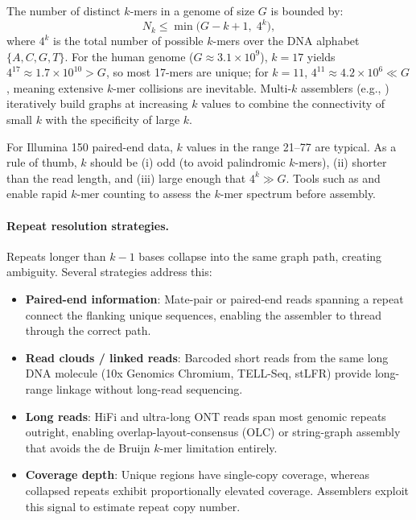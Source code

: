 The number of distinct $k$-mers in a genome of size $G$ is bounded by:
\begin{equation}
\label{eq:genomeseq:kmers}
N_k \leq \min\!\bigl(G - k + 1,\; 4^k\bigr),
\end{equation}
where $4^k$ is the total number of possible $k$-mers over the DNA alphabet $\{A,C,G,T\}$. For the human genome ($G \approx 3.1 \times 10^9$), $k = 17$ yields $4^{17} \approx 1.7 \times 10^{10} > G$, so most 17-mers are unique; for $k = 11$, $4^{11} \approx 4.2 \times 10^6 \ll G$, meaning extensive $k$-mer collisions are inevitable. Multi-$k$ assemblers (e.g., ) iteratively build graphs at increasing $k$ values to combine the connectivity of small $k$ with the specificity of large $k$.

\begin{tipbox}[title={Practical $k$-mer Selection Rules}]
For Illumina 150\basepair{} paired-end data, $k$ values in the range 21--77 are typical. As a rule of thumb, $k$ should be (i) odd (to avoid palindromic $k$-mers), (ii) shorter than the read length, and (iii) large enough that $4^k \gg G$. Tools such as  and  enable rapid $k$-mer counting to assess the $k$-mer spectrum before assembly.
\end{tipbox}

\paragraph{Repeat resolution strategies.}
Repeats longer than $k - 1$ bases collapse into the same graph path, creating ambiguity. Several strategies address this:

\begin{itemize}[nosep]
  \item \textbf{Paired-end information}: Mate-pair or paired-end reads spanning a repeat connect the flanking unique sequences, enabling the assembler to thread through the correct path.
  \item \textbf{Read clouds / linked reads}: Barcoded short reads from the same long DNA molecule (10x Genomics Chromium, TELL-Seq, stLFR) provide long-range linkage without long-read sequencing.
  \item \textbf{Long reads}: HiFi and ultra-long ONT reads span most genomic repeats outright, enabling overlap-layout-consensus (OLC) or string-graph assembly that avoids the de Bruijn $k$-mer limitation entirely.
  \item \textbf{Coverage depth}: Unique regions have single-copy coverage, whereas collapsed repeats exhibit proportionally elevated coverage. Assemblers exploit this signal to estimate repeat copy number.
\end{itemize}

